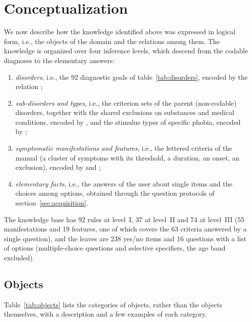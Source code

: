 \section{Conceptualization}
\label{sec:conceptualization}

We now describe how the knowledge identified above was expressed in logical
form, i.e., the objects of the domain and the relations among them. The
knowledge is organized over four inference levels, which descend from the
codable diagnoses to the elementary answers:
\begin{enumerate}[label=(\Roman*)]
    \item \emph{disorders}, i.e., the 92 diagnostic goals of
    table~\ref{tab:disorders}, encoded by the relation ;
    \item \emph{sub-disorders and types}, i.e., the criterion sets of the
    parent (non-codable) disorders, together with the shared exclusions on
    substances and medical conditions, encoded by , and the
    stimulus types of specific phobia, encoded by
    ;
    \item \emph{symptomatic manifestations and features}, i.e., the lettered
    criteria of the manual (a cluster of symptoms with its threshold, a
    duration, an onset, an exclusion), encoded by
     and ;
    \item \emph{elementary facts}, i.e., the answers of the user about single
    items and the choices among options, obtained through the question
    protocols of section~\ref{sec:acquisition}.
\end{enumerate}
The knowledge base has 92 rules at level~I, 37 at level~II and 74 at
level~III (55 manifestations and 19 features, one of which covers the 63
criteria answered by a single question), and the leaves are 238 yes/no items
and 16 questions with a list of options (multiple-choice questions and selective
specifiers, the age band excluded).


\subsection{Objects}

Table~\ref{tab:objects} lists the categories of objects, rather than the
objects themselves, with a description and a few examples of each category.

